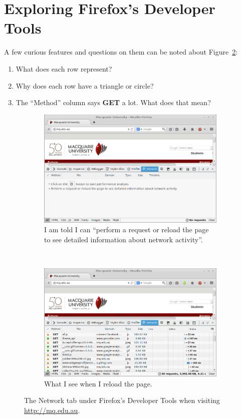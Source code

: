 \documentclass[11pt,a4paper]{report}
\newcommand{\Q}[2]{
	\label{#2}
	\marginpar{\textbf{Q#1.\begin{NoHyper}\ref{#2}\end{NoHyper} }}
}
\newcounter{saveenumi}
\newcommand{\savei}{\setcounter{saveenumi}{\value{enumi}}}
\begin{document}
	\section{Exploring Firefox's Developer Tools}
	A few curious features and questions on them can be noted about Figure~\ref{fig:pressedf12reloaded}:
	\begin{enumerate}
		\item What does each row represent? \Q{2}{enum:row}
		\item Why does each row have a triangle or circle? \Q{2}{enum:tricirc}
		\item The ``Method'' column says \textbf{GET} a lot. What does that mean? \Q{2}{enum:get}
		\savei
	\end{enumerate}
	\begin{figure}
		\centering
		\begin{subfigure}{\textwidth}
			\includegraphics[width=\textwidth]{pressedf12.png}
			\caption{I am told I can ``perform a request or reload the page to see detailed information about network activity''.}
			\label{fig:pressedf12}
		\end{subfigure} \\
		\vspace{0.5cm}
		\begin{subfigure}{\textwidth}
			\includegraphics[width=\textwidth]{pressedf12reloaded.png}
			\caption{What I see when I reload the page.}
			\label{fig:pressedf12reloaded}
		\end{subfigure}
		\caption{The Network tab under Firefox's Developer Tools when visiting \url{http://mq.edu.au}.}
		\label{fig:pressedf12figs}
	\end{figure}
\end{document}
